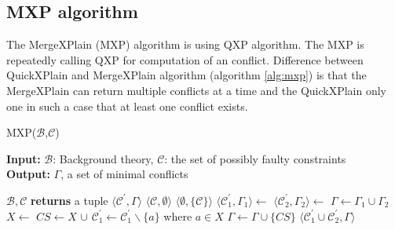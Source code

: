 \documentclass[12pt,a4paper]{article}
\begin{document}
\subsection{MXP algorithm}
The MergeXPlain (MXP) algorithm is using QXP algorithm. The MXP is repeatedly calling QXP for computation of an conflict. Difference between QuickXPlain and MergeXPlain algorithm (algorithm \ref{alg:mxp}) is that the MergeXPlain can return multiple conflicts at a time and the QuickXPlain only one in such a case that at least one conflict exists. 

\begin{algorithm}[H]
	\footnotesize
	\caption{MXP($\mathcal{B}$,$\mathcal{C}$)}
	\label{alg:mxp}
	\textbf{Input:} $\mathcal{B}$: Background theory, $\mathcal{C}$: the set of possibly faulty constraints  \\
	\textbf{Output:} $\Gamma$, a set of minimal conflicts
	\begin{algorithmic}[1]
		\State {}
		\State \Return {$\emptyset$}
		\EndIf
		\State \Return {$\Gamma$}
		
		\medskip
		 {$\mathcal{B}, \mathcal{C}$} \textbf{returns} a tuple $\langle \mathcal{C}^{\prime}, \Gamma \rangle$
		\State \Return $\langle \mathcal{C}, \emptyset \rangle$
		\State \Return $\langle \emptyset, \{\mathcal{C}\} \rangle$
		\EndIf
		\State $\langle \mathcal{C}_{1}^{\prime}, \Gamma_{1} \rangle \gets$ 
		\State $\langle \mathcal{C}_{2}^{\prime}, \Gamma_{2} \rangle \gets$ 
		\State $\Gamma \gets \Gamma_{1} \cup \Gamma_{2}$
		\State $X \gets $ 
		\State $CS \gets X$ $\cup$ 
		\State $\mathcal{C}_{1}^{\prime} \gets \mathcal{C}_{1}^{\prime} \backslash \{a\}$ where $a \in X$
		\State $\Gamma \gets \Gamma \cup \{CS\}$
		\EndWhile
		\State \Return $\langle \mathcal{C}_{1}^{\prime} \cup \mathcal{C}_{2}^{\prime}, \Gamma \rangle$
		\EndFunction			
	\end{algorithmic}
\end{algorithm}
\end{document}
